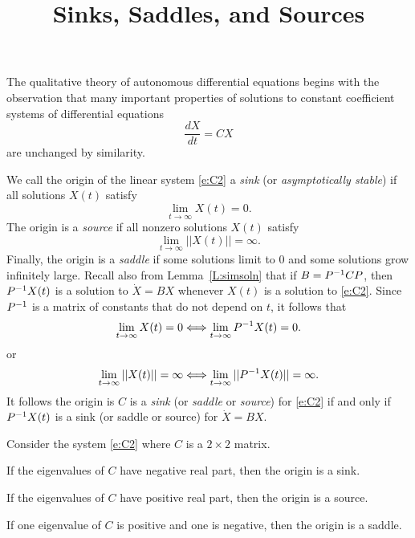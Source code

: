 \documentclass{ximera}
\title{Sinks, Saddles, and Sources}
\begin{document}
\begin{abstract}
\end{abstract}
\maketitle

 \label{S:6.7}

The qualitative theory of autonomous differential equations begins with
the observation that many important properties of solutions to constant
coefficient systems of differential equations
\begin{equation} \label{e:C2}
\frac{dX}{dt}=CX
\end{equation}
are unchanged by similarity.  

We call the origin of the linear system \eqref{e:C2} a {\em sink} (or 
{\em asymptotically stable}) if all solutions $X(t)$ satisfy
\[
\lim_{t\to\infty}X(t) = 0.
\]
The origin is a {\em source} if all nonzero solutions $X(t)$ satisfy
\[
\lim_{t\to\infty}||X(t)|| = \infty.
\]
Finally, the origin is a {\em saddle} if some solutions limit to $0$ and some 
solutions grow infinitely large.  Recall also from Lemma~\ref{L:simsoln} that
if $B=P^{-1} CP$, then $P^{-1} X(t)$ is a solution to $\dot{X}=BX$ whenever
$X(t)$ is a solution to \eqref{e:C2}.  Since $P^{-1}$ is a matrix of constants
that do not depend on $t$, it follows that
\[
\lim_{t\to\infty}X(t) = 0 \Longleftrightarrow \lim_{t\to\infty}P^{-1} X(t) = 0.
\]
or 
\[
\lim_{t\to\infty}||X(t)|| = \infty \Longleftrightarrow \lim_{t\to\infty}||P^{-1} X(t)|| = \infty.
\]
It follows the origin is $C$ is a {\em sink} (or {\em saddle} 
or {\em source}) for \eqref{e:C2} if and only if $P^{-1} X(t)$ is a 
sink (or saddle or source) for $\dot{X}=BX$.  

\begin{theorem}  \label{C:asympstlin} Consider the system \eqref{e:C2} where 
$C$ is a $2\times 2$ matrix.  
\begin{enumeratea}
\item If the eigenvalues of $C$ have negative real part, then the origin is a sink. 
\item If the eigenvalues of $C$ have positive real part, then the origin is a source.
\item If one eigenvalue of $C$ is positive and one is negative, then the origin is a saddle.
\end{enumeratea}  
\end{theorem}
\end{document}
